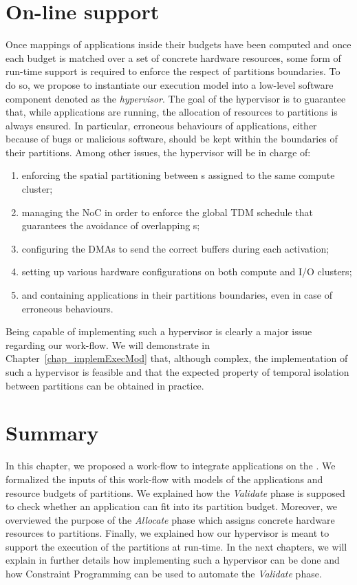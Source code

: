 \documentclass[main.tex]{subfiles}
\begin{document}
\section{On-line support}
\label{sec_framework_onLineSupport}
Once mappings of applications inside their budgets have been computed and once
each budget is matched over a set of concrete hardware resources, some form of
run-time support is required to enforce the respect of partitions boundaries.
To do so, we propose to instantiate our execution model into a low-level
software component denoted as the \emph{hypervisor}. The goal of the hypervisor
is to guarantee that, while applications are running, the allocation of
resources to partitions is always ensured. In particular, erroneous behaviours
of applications, either because of bugs or malicious software, should be kept
within the boundaries of their partitions. Among other issues, the hypervisor
will be in charge of:
\begin{enumerate}
    \item enforcing the spatial partitioning between \PN{}s assigned to the
        same compute cluster;
    \item managing the NoC in order to enforce the global TDM schedule that
        guarantees the avoidance of overlapping \PC{}s;
    \item configuring the DMAs to send the correct buffers during each \PC{}
        activation;
    \item setting up various hardware configurations on both compute and I/O
        clusters;
    \item and containing applications in their partitions boundaries, even in
        case of erroneous behaviours.
\end{enumerate}
Being capable of implementing such a hypervisor is clearly a major issue
regarding our work-flow. We will demonstrate in
Chapter~\ref{chap_implemExecMod} that, although complex, the implementation of
such a hypervisor is feasible and that the expected property of temporal
isolation between partitions can be obtained in practice.

\section{Summary} In this chapter, we proposed a work-flow to integrate
applications on the \mppalong. We formalized the inputs of this work-flow with
models of the applications and resource budgets of partitions. We explained how
the \emph{Validate} phase is supposed to check whether an application can fit
into its partition budget. Moreover, we overviewed the purpose of the
\emph{Allocate} phase which assigns concrete hardware resources to partitions.
Finally, we explained how our hypervisor is meant to support the execution of
the partitions at run-time. In the next chapters, we will explain in further
details how implementing such a hypervisor can be done and how Constraint
Programming can be used to automate the \emph{Validate} phase.


\clearpage
\subbiblio
\end{document}

